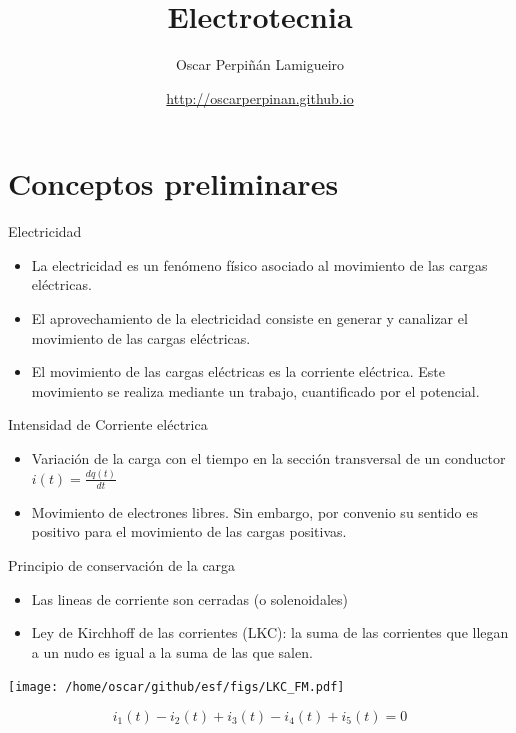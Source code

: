 \documentclass[xcolor={usenames,svgnames,dvipsnames}]{beamer}
\author{Oscar Perpiñán Lamigueiro}
\date{\url{http://oscarperpinan.github.io}}
\title{Electrotecnia}
\begin{document}
\maketitle

\section{Conceptos preliminares}
\label{sec:org4c46145}

\begin{frame}[label={sec:orgfcef17e}]{Electricidad}
\begin{itemize}
\item La electricidad es un fenómeno físico asociado al \alert{movimiento de las
cargas eléctricas}.

\item El aprovechamiento de la electricidad consiste en generar y canalizar
el movimiento de las cargas eléctricas.

\item El movimiento de las cargas eléctricas es la \alert{corriente eléctrica}.
Este movimiento se realiza mediante un trabajo, cuantificado por el
\alert{potencial}.
\end{itemize}
\end{frame}

\begin{frame}[label={sec:org95ba2cf}]{Intensidad de Corriente eléctrica}
\begin{itemize}
\item \alert{Variación de la carga con el tiempo en la sección transversal de un
conductor} \(i(t)=\frac{dq(t)}{dt}\)

\item Movimiento de electrones libres. Sin embargo, por convenio su sentido
es positivo para el movimiento de las cargas positivas.
\end{itemize}
\end{frame}

\begin{frame}[label={sec:org7ecbc50}]{Principio de conservación de la carga}
\begin{itemize}
\item Las lineas de corriente son cerradas (o solenoidales)

\item \alert{Ley de Kirchhoff de las corrientes (LKC)}: la suma de las corrientes
que llegan a un nudo es igual a la suma de las que salen.
\end{itemize}

\begin{center}
\texttt{[image: /home/oscar/github/esf/figs/LKC\_FM.pdf]}
\end{center}

\[
i_1(t) - i_2(t) + i_3(t) - i_4(t) + i_5(t) = 0
\]
\end{frame}
\end{document}
